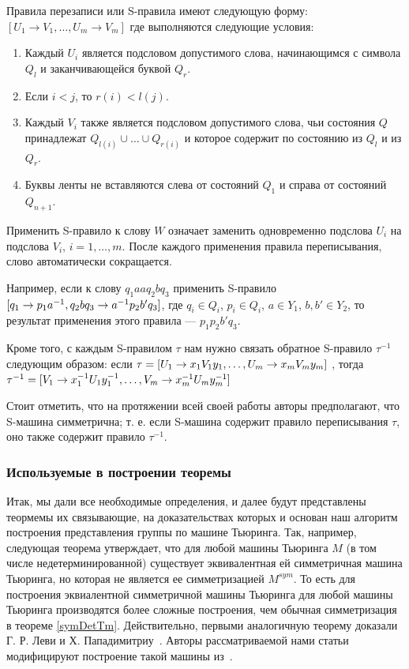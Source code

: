 \documentclass[14pt]{matmex-diploma-custom}
\begin{document}
Правила перезаписи или S-правила имеют следующую форму:
$ [U_1 \to V_1, \dots, U_m \to V_m] $
где выполняются следующие условия:
\begin{enumerate}
    \item Каждый $ U_i $ является подсловом допустимого слова, начинающимся с символа $ Q_l $ и заканчивающейся буквой $ Q_r $.
    \item Если $i < j$, то $r(i) < l(j)$.
    \item Каждый $ V_i $ также является подсловом допустимого слова, чьи состояния $Q$ 
    принадлежат $ Q_{l(i)} \cup \dots \cup Q_{r(i)} $ и которое содержит по состоянию из $Q_l$ и из $Q_r$.
    \item Буквы ленты не вставляются слева от состояний $ Q_1 $ и справа от состояний $ Q_{n + 1} $.
\end{enumerate}

Применить S-правило к слову $ W $ означает заменить одновременно
подслова $ U_i $ на подслова $ V_i $, $ i = 1, \dots, m $. 
После каждого применения правила переписывания, слово автоматически сокращается.

Например, если к слову $ q_1 a a q_2 b q_3 $ применить S-правило
$\newline
[q_1 \to p_1 a^{-1}, q_2 b q_3 \to a^{-1} p_2 b' q_3]$,
где $q_i \in Q_i$, $p_i \in Q_i$, $a \in Y_1$, $b, b' \in Y_2$, то результат
применения этого правила --- $ p_1 p_2 b' q_3 $.

Кроме того, с каждым S-правилом $ \tau $ нам нужно связать обратное 
S-правило $ \tau^{-1} $ следующим образом:
если
$\\ \tau = [U_1 \to x_1 V_1 y_1, \dots, U_m \to x_m V_m y_m]$
, тогда
$\\ \tau^{-1} = [V_1 \to x_1^{-1} U_1 y_1^{-1}, \dots, V_m \to x_m^{-1} U_m y_m^{-1}]$

Стоит отметить, что на протяжении всей своей работы авторы предполагают, что
S-машина симметрична; т. е. если S-машина содержит
правило переписывания $ \tau $, оно также содержит правило $ \tau^{-1} $.

\subsubsection{Используемые в построении теоремы}

Итак, мы дали все необходимые определения, и далее будут представлены теормемы их связывающие,
на доказательствах которых и основан наш алгоритм построения представления группы по машине Тьюринга.
Так, например, следующая теорема утверждает, что для любой машины Тьюринга $M$ (в том числе недетерминированной) существует эквивалентная ей симметричная машина Тьюринга, но которая не является ее симметризацией $M^{sym}$. То есть для построения эквиалентной симметричной машины Тьюринга для любой машины Тьюринга производятся более сложные построения, чем обычная симметризация в теореме \ref{symDetTm}. Действительно, 
первыми аналогичную теорему доказали Г. Р. Леви и Х. Пападимитриу~\cite{LEWIS1982161}. 
Авторы рассматриваемой нами статьи модифицируют построение такой машины из~\cite{symTM}.
\end{document}
